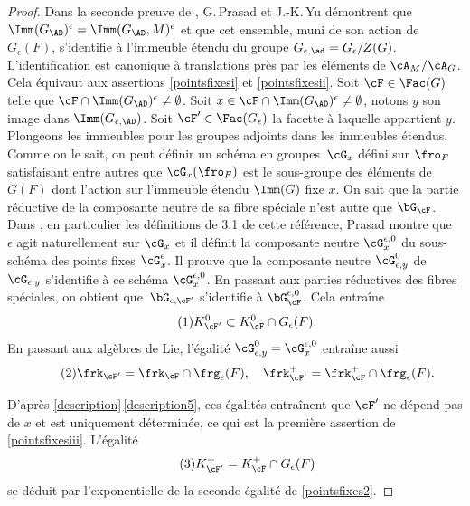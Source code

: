 \begin{proof}
Dans la seconde preuve de \cite[Th.\,1.9]{PY}, G.\,Prasad et J.-K.\,Yu démon\-trent que $\Imm(G_{\AD})^{\epsilon}=\Imm(G_{\AD},M)^{\epsilon}$ et que cet ensemble, muni de son action de $G_{\epsilon}(F)$, s'identifie à l'immeuble étendu du groupe $G_{\epsilon,\ad}=G_{\epsilon}/Z(G)$. L'identification est canonique à translations près par les éléments de $\cA_{M}/\cA_{G}$. Cela équivaut aux assertions \eqref{pointsfixesi} et \eqref{pointsfixesii}. Soit $\cF\in \Fac(G)$ telle que $\cF\cap \Imm(G_{\AD})^{\epsilon}\neq\emptyset$. Soit $x\in \cF\cap \Imm(G_{\AD})^{\epsilon}\neq\emptyset$, notons $y$ son image dans $\Imm(G_{\epsilon,\AD})$. Soit $\cF'\in \Fac(G_{\epsilon})$ la facette à laquelle appartient $y$. Plongeons les immeubles pour les groupes adjoints dans les immeubles étendus. Comme on le sait, on peut définir un schéma en groupes~$\cG_{x}$ défini sur $\fro_{F}$ satisfaisant entre autres que $\cG_{x}(\fro_{F})$ est le sous-groupe des éléments de $G(F)$ dont l'action sur l'immeuble étendu $\Imm(G)$ fixe $x$. On sait que la partie réductive de la composante neutre de sa fibre spéciale n'est autre que $\bG_{\cF}$. Dans \cite[\S3]{P}, \cf en particulier les définitions de 3.1 de cette référence, Prasad montre que~$\epsilon$ agit naturellement sur $\cG_{x}$ et il définit la composante neutre $\cG_{x}^{\epsilon,0}$ du sous-schéma des points fixes $\cG_{x}^{\epsilon}$. Il prouve que la composante neutre $\cG_{\epsilon,y}^{0}$ de $\cG_{\epsilon,y}$ s'identifie à ce schéma $\cG_{x}^{\epsilon,0}$. En passant aux parties réductives des fibres spéciales, on obtient que~$\bG_{\epsilon,\cF'}$ s'identifie à $\bG_{\cF}^{\epsilon,0}$. Cela entraîne
\begin{equation}\tag{1}\label{pointsfixes1}
K_{\cF'}^0\subset K_{\cF}^0\cap G_{\epsilon}(F).
\end{equation}
En passant aux algèbres de Lie, l'égalité $\cG_{\epsilon,y}^{0}=\cG_{x}^{\epsilon,0}$ entraîne aussi
\begin{equation}\tag{2}\label{pointsfixes2}
\frk_{\cF'}=\frk_{\cF}\cap \frg_{\epsilon}(F),\quad \frk^+_{\cF'}=\frk^+_{\cF}\cap \frg_{\epsilon}(F).
\end{equation}

D'après \ref{description}\,\eqref{description5}, ces égalités entraînent que $\cF'$ ne dépend pas de $x$ et est uniquement déterminée, ce qui est la première assertion de \eqref{pointsfixesiii}.
L'égalité
\begin{equation}\tag{3}\label{pointsfixes3}
K_{\cF'}^+=K_{\cF}^+\cap G_{\epsilon}(F)
\end{equation}
se déduit par l'exponentielle de la seconde égalité de \eqref{pointsfixes2}.


\end{proof}
